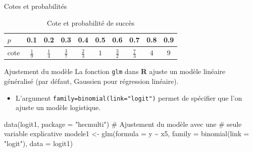\documentclass[
  ignorenonframetext,
]{beamer}
\newenvironment{Shaded}{\begin{snugshade}}{\end{snugshade}}
\newcommand{\AttributeTok}[1]{\textcolor[rgb]{0.40,0.45,0.13}{#1}}
\newcommand{\CommentTok}[1]{\textcolor[rgb]{0.37,0.37,0.37}{#1}}
\newcommand{\FunctionTok}[1]{\textcolor[rgb]{0.28,0.35,0.67}{#1}}
\newcommand{\NormalTok}[1]{\textcolor[rgb]{0.00,0.23,0.31}{#1}}
\newcommand{\OtherTok}[1]{\textcolor[rgb]{0.00,0.23,0.31}{#1}}
\newcommand{\SpecialCharTok}[1]{\textcolor[rgb]{0.37,0.37,0.37}{#1}}
\newcommand{\StringTok}[1]{\textcolor[rgb]{0.13,0.47,0.30}{#1}}
\providecommand{\tightlist}{%
  \setlength{\itemsep}{0pt}\setlength{\parskip}{0pt}}\usepackage{longtable,booktabs,array}
\begin{document}
\begin{frame}{Cotes et probabilités}
\protect\hypertarget{cotes-et-probabilituxe9s}{}
\hypertarget{tbl-cotes}{}
\begin{table}
\caption{\label{tbl-cotes}Cote et probabilité de succès }\tabularnewline

\centering
\begin{tabular}{lccccccccc}
\toprule
\(p\) & 0.1 & 0.2 & 0.3 & 0.4 & 0.5 & 0.6 & 0.7 & 0.8 & 0.9\\
\midrule
cote & \(\frac{1}{9}\) & \(\frac{1}{4}\) & \(\frac{3}{7}\) & \(\frac{2}{3}\) & \(1\) & \(\frac{3}{2}\) & \(\frac{7}{3}\) & \(4\) & \(9\)\\
\bottomrule
\end{tabular}
\end{table}
\end{frame}

\begin{frame}[fragile]{Ajustement du modèle}
\protect\hypertarget{ajustement-du-moduxe8le}{}
La fonction \texttt{glm} dans \textbf{R} ajuste un modèle linéaire
généralisé (par défaut, Gaussien pour régression linéaire).

\begin{itemize}
\tightlist
\item
  L'argument \texttt{family=binomial(link="logit")} permet de spécifier
  que l'on ajuste un modèle logistique.
\end{itemize}

\begin{Shaded}
\begin{Highlighting}[numbers=left,,]
\FunctionTok{data}\NormalTok{(logit1, }\AttributeTok{package =} \StringTok{"hecmulti"}\NormalTok{)}
\CommentTok{\# Ajustement du modèle avec une}
\CommentTok{\#  seule variable explicative}
\NormalTok{modele1 }\OtherTok{\textless{}{-}} \FunctionTok{glm}\NormalTok{(}\AttributeTok{formula =}\NormalTok{ y }\SpecialCharTok{\textasciitilde{}}\NormalTok{ x5,}
            \AttributeTok{family =} \FunctionTok{binomial}\NormalTok{(}\AttributeTok{link =} \StringTok{"logit"}\NormalTok{),}
            \AttributeTok{data =}\NormalTok{ logit1)}
\end{Highlighting}
\end{Shaded}
\end{frame}
\end{document}
